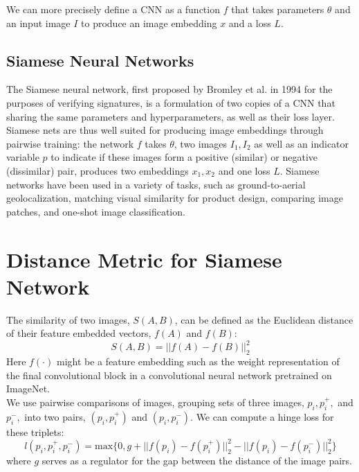 \documentclass[pageno]{jpaper}
\begin{document}
We can more precisely define a CNN as a function $f$ that takes parameters $\theta$ and an input image $I$ to produce an image embedding $x$ and a loss $L$.


\subsection{Siamese Neural Networks}
The Siamese neural network, first proposed by Bromley et al. in 1994\cite{bromley1993signature} for the purposes of verifying signatures, is a formulation of two copies of a CNN that sharing the same parameters and hyperparameters, as well as their loss layer. Siamese nets are thus well suited for producing image embeddings through pairwise training: the network $f$ takes $\theta$, two images $I_1, I_2$ as well as an indicator variable $p$ to indicate if these images form a positive (similar) or negative (dissimilar) pair, produces two embeddings $x_1, x_2$ and one loss $L$. Siamese networks have been used in a variety of tasks, such as ground-to-aerial geolocalization\cite{lin2015learning}, matching visual similarity for product design\cite{bell2015learning}, comparing image patches\cite{zagoruyko2015learning}, and one-shot image classification\cite{koch2015siamese}.\\


\section{Distance Metric for Siamese Network}
The similarity of two images, $S(A,B)$, can be defined as the Euclidean distance of their feature embedded vectors, $f(A)$ and $f(B)$:
\begin{equation}
	S(A,B) = ||f(A) - f(B)||_2^2
\end{equation}
Here $f(\cdot)$ might be a feature embedding such as the weight representation of the final convolutional block in a convolutional neural network pretrained on ImageNet.\\

We use pairwise comparisons of images, grouping sets of three images, $p_i, p_i^+,$ and $p_i^-,$ into two pairs, $(p_i, p_i^+)$ and $(p_i, p_i^-)$. We can compute a hinge loss for these triplets:
\begin{equation}
	l(p_i, p_i^+, p_i^-) = \text{max}\{0, g + ||f(p_i) - f(p_i^+)||_2^2 - ||f(p_i)-f(p_i^-)||_2^2\}
\end{equation}
where $g$ serves as a regulator for the gap between the distance of the image pairs.
\end{document}
